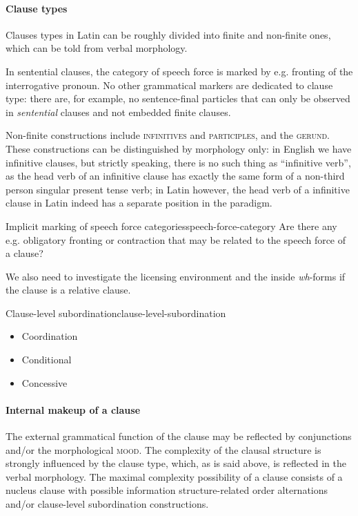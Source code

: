 \documentclass[a4paper, oneside, 12pt]{report}
\newcommand{\form}[1]{\emph{#1}}
\newcommand*{\category}[1]{\textsc{#1}}
\begin{document}
\paragraph*{Clause types}
Clauses types in Latin can be roughly divided into finite and non-finite ones,
which can be told from verbal morphology.

In sentential clauses, 
the category of speech force is marked by e.g. fronting of the interrogative pronoun.
No other grammatical markers are dedicated to clause type:
there are, for example, no sentence-final particles 
that can only be observed in \emph{sentential} clauses
and not embedded finite clauses.

Non-finite constructions include \category{infinitives} and \category{participles}, and the \category{gerund}.
These constructions can be distinguished by morphology only:
in English we have infinitive clauses,
but strictly speaking, there is no such thing as ``infinitive verb'',
as the head verb of an infinitive clause 
has exactly the same form of a non-third person singular present tense verb;
in Latin however, the head verb of a infinitive clause in Latin 
indeed has a separate position in the paradigm.

\begin{todobox}{Implicit marking of speech force categories}{speech-force-category}
    Are there any e.g. obligatory fronting or contraction that may be related to the speech force of a clause?
    
    We also need to investigate the licensing environment
    and the inside \form{wh}-forms if the clause is a relative clause.
\end{todobox}

\begin{todobox}{Clause-level subordination}{clause-level-subordination}
    \begin{itemize}
        \item Coordination
        \item Conditional
        \item Concessive
    \end{itemize}
\end{todobox}

\paragraph*{Internal makeup of a clause}\label{sec:grammatical.clause.overview.internal}
The external grammatical function of the clause
may be reflected by conjunctions and/or the morphological \category{mood}.
The complexity of the clausal structure is strongly influenced by the clause type,
which, as is said above, is reflected in the verbal morphology.
The maximal complexity possibility of a clause 
consists of a nucleus clause with possible information structure-related order alternations 
and/or clause-level subordination constructions.
\end{document}
